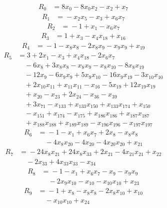 \begingroup\small
\begin{align*}
R_{0}&={}8x_{0} -8x_{0}x_{2} -x_{2} +x_{7}
\end{align*}
\begin{align*}
R_{1}&={}-x_{2}x_{5} -x_{3} +x_{6}x_{7}
\end{align*}
\begin{align*}
R_{2}&={}-1 +x_{1} -x_{6}x_{7}
\end{align*}
\begin{align*}
R_{3}&={}1 +x_{3} -x_{4}x_{18} +x_{16}
\end{align*}
\begin{align*}
R_{4}&={}-1 -x_{8}x_{8} -2x_{8}x_{9} -x_{9}x_{9} +x_{19}
\end{align*}
\begin{align*}
R_{5}&={}3 +2x_{1} -x_{3} +x_{4}x_{18} -2x_{6}x_{7}\\
&\quad{}-6x_{8} +3x_{8}x_{8} -x_{8}x_{9} -x_{8}x_{10} -8x_{8}x_{19}\\
&\quad{}-12x_{9} -6x_{9}x_{9} +5x_{9}x_{10} -16x_{9}x_{19} -3x_{10}x_{10}\\
&\quad{}+2x_{10}x_{11} +x_{11}x_{11} -x_{16} -5x_{19} +12x_{19}x_{19}\\
&\quad{}+x_{20} -x_{23} +2x_{24} -x_{36} -x_{39}\\
&\quad{}+3x_{71} -x_{133} +x_{133}x_{150} +x_{133}x_{174} +x_{150}\\
&\quad{}-x_{151} +x_{174} -x_{175} +x_{186}x_{186} +x_{187}x_{187}\\
&\quad{}+x_{188}x_{188} +x_{189}x_{189} -x_{196}x_{196} -x_{197}x_{197}
\end{align*}
\begin{align*}
R_{6}&={}-1 -x_{1} +x_{6}x_{7} +2x_{8} -x_{8}x_{8}\\
&\quad{}-4x_{8}x_{20} -4x_{20} -4x_{20}x_{20} +x_{21}
\end{align*}
\begin{align*}
R_{7}&={}-24x_{8}x_{21} +24x_{8}x_{33} +2x_{21} -4x_{21}x_{21} +x_{22}\\
&\quad{}-2x_{33} +4x_{33}x_{33} -x_{34}
\end{align*}
\begin{align*}
R_{8}&={}-1 -x_{1} +x_{6}x_{7} -x_{9} -x_{9}x_{9}\\
&\quad{}-2x_{9}x_{10} -x_{10} -x_{10}x_{10} +x_{23}
\end{align*}
\begin{align*}
R_{9}&={}-1 +x_{8} -x_{8}x_{8} -2x_{8}x_{10} +x_{10}\\
&\quad{}-x_{10}x_{10} +x_{24}
\end{align*}
